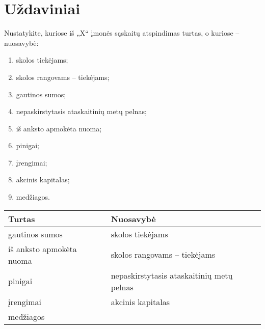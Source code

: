 \chapter{Uždaviniai}


\begin{tasks}
  
  \begin{task}
    \begin{condition}
      Nustatykite, kuriose iš „X“ įmonės sąskaitų atspindimas turtas,
      o kuriose – nuosavybė:
      \begin{enumerate}
        \item skolos tiekėjams;
        \item skolos rangovams – tiekėjams;
        \item gautinos sumos;
        \item nepaskirstytasis ataskaitinių metų pelnas;
        \item iš anksto apmokėta nuoma;
        \item pinigai;
        \item įrengimai;
        \item akcinis kapitalas;
        \item medžiagos.
      \end{enumerate}
    \end{condition}
    \begin{solution}
      \begin{tabularx}{\tablewidth}[]{X | X}
        Turtas & Nuosavybė \\
        \hline
        gautinos sumos
          & skolos tiekėjams \\
        iš anksto apmokėta nuoma
          & skolos rangovams – tiekėjams \\
        pinigai
          & nepaskirstytasis ataskaitinių metų pelnas \\
        įrengimai
          & akcinis kapitalas \\
        medžiagos & \\
      \end{tabularx}
    \end{solution}
  \end{task}


\end{tasks}
